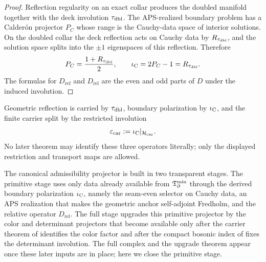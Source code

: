 \begin{proof}
Reflection regularity on an exact collar produces the doubled manifold together with the deck
involution $\tau_{\mathrm{dbl}}$. The APS-realized boundary problem has a Calder\'on projector $P_C$ whose
range is the Cauchy-data space of interior solutions. On the doubled collar the deck reflection
acts on Cauchy data by $R_{\tau_{\mathrm{dbl}}}$, and the solution space splits into the $\pm1$ eigenspaces of
this reflection. Therefore
\[
P_C=\frac{1+R_{\tau_{\mathrm{dbl}}}}{2},
\qquad
\iota_{\mathrm C}=2P_C-1=R_{\tau_{\mathrm{dbl}}}.
\]
The formulas for $D_{\mathrm{ref}}$ and $D_{\mathrm{rel}}$ are the even and odd parts of $D$ under
the induced involution.
\end{proof}

\begin{corollary}
Geometric reflection is carried by $\tau_{\mathrm{dbl}}$, boundary polarization by $\iota_{\mathrm C}$, and the finite
carrier split by the restricted involution
\[
\varepsilon_{\mathrm{car}}:=\iota_{\mathrm C}|_{\mathcal H_{\mathrm{car}}}.
\]
No later theorem may identify these three operators literally; only the displayed restriction and
transport maps are allowed.
\end{corollary}

The canonical admissibility projector is built in two transparent stages. The primitive stage
uses only data already available from $\mathfrak T_{\partial}^{\min}$ through the derived boundary polarization $\iota_{\mathrm C}$,
namely the seam-even selector on Cauchy data, an APS realization that makes the geometric anchor
self-adjoint Fredholm, and the relative operator $D_{\mathrm{rel}}$. The full stage upgrades this
primitive projector by the color and determinant projectors that become available only after the
carrier theorem of  identifies the color factor and after the
compact bosonic index of  fixes the determinant involution. The full
complex and the upgrade theorem appear once these later inputs are in place; here we close the
primitive stage.

